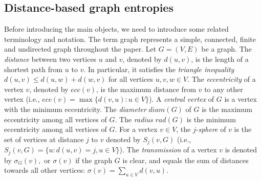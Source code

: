 \documentclass{article}
\newcommand{\diam}{diam}
\newcommand{\rad}{rad}
\begin{document}
\subsection{Distance-based graph entropies}\label{subsec:distbasedentropies}

Before introducing the main objects, we need to introduce some related terminology and notation. The term graph represents a simple, connected, finite and undirected graph throughout the paper. Let $G=(V,E)$ be a graph. The {\em distance} between two vertices $u$ and $v$, denoted by $d(u,v)$, is the length of a shortest path from $u$ to $v$. In particular, it satisfies the {\em triangle inequality} $d(u,v)\leq d(u,w)+d(w,v)$ for all vertices $u,v,w\in V$.
The {\em eccentricity} of a vertex $v$, denoted by $ecc(v)$, is the maximum distance from $v$ to any other vertex  (i.e., $ecc(v)=\max\{d(v,u): u\in V\}$). A {\em central vertex} of $G$ is a vertex with the minimum eccentricity. 
The {\em diameter} $\diam(G)$ of $G$ is the maximum eccentricity among all vertices of $G$. The {\em radius} $\rad(G)$ is the minimum eccentricity among all vertices of $G$. For a vertex $v\in V$, the $j$-{\em sphere} of $v$ is the set of vertices at distance $j$ to $v$ denoted by $S_j(v,G)$ (i.e., $S_{j}(v,G)=\{u: d(u,v)=j, u\in V\}$).
The {\em transmission} of a vertex $v$ is denoted by $\sigma_G(v),$ or $\sigma(v)$ if the graph $G$ is clear, and equals the sum of distances towards all other vertices:
$\sigma(v) = \sum_{u \in V} d(v,u).$ 
\end{document}

